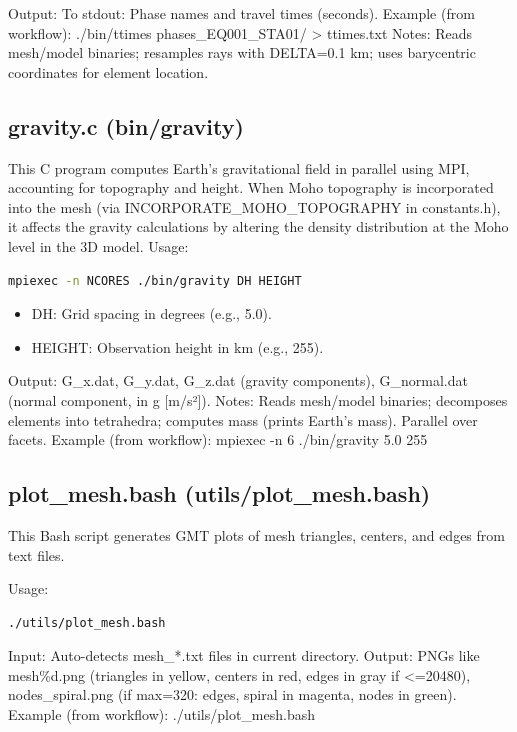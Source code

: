 \documentclass[12pt,a4paper]{article}
\begin{document}
Output: To stdout: Phase names and travel times (seconds).
Example (from workflow): ./bin/ttimes phases\_EQ001\_STA01/ > ttimes.txt
Notes: Reads mesh/model binaries; resamples rays with DELTA=0.1 km; uses barycentric coordinates for element location.

\subsection{gravity.c (bin/gravity)}
This C program computes Earth's gravitational field in parallel using MPI, accounting for topography and height. When Moho topography is incorporated into the mesh (via INCORPORATE\_MOHO\_TOPOGRAPHY in constants.h), it affects the gravity calculations by altering the density distribution at the Moho level in the 3D model.
Usage:

\begin{lstlisting}[language=Bash]
mpiexec -n NCORES ./bin/gravity DH HEIGHT
\end{lstlisting}

\begin{itemize}
    \item DH: Grid spacing in degrees (e.g., 5.0).
    \item HEIGHT: Observation height in km (e.g., 255).
\end{itemize}

Output: G\_x.dat, G\_y.dat, G\_z.dat (gravity components), G\_normal.dat (normal component, in g [m/s²]).
Notes: Reads mesh/model binaries; decomposes elements into tetrahedra; computes mass (prints Earth's mass). Parallel over facets.
Example (from workflow): mpiexec -n 6 ./bin/gravity 5.0 255

\subsection{plot\_mesh.bash (utils/plot\_mesh.bash)}
This Bash script generates GMT plots of mesh triangles, centers, and edges from text files.

Usage:

\begin{lstlisting}[language=Bash]
./utils/plot_mesh.bash
\end{lstlisting}

Input: Auto-detects mesh\_*.txt files in current directory.
Output: PNGs like mesh\%d.png (triangles in yellow, centers in red, edges in gray if <=20480), nodes\_spiral.png (if max=320: edges, spiral in magenta, nodes in green).
Example (from workflow): ./utils/plot\_mesh.bash
\end{document}
